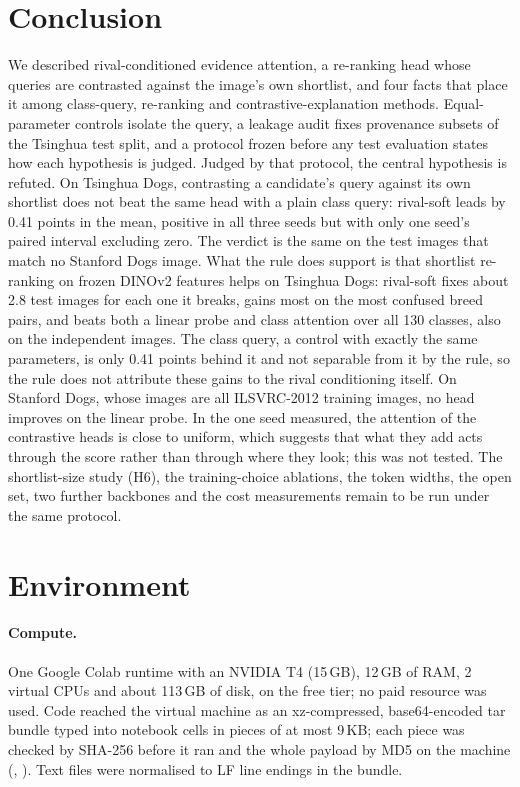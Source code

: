 \documentclass[11pt,a4paper]{article}
\theoremstyle{plain}
\newcommand{\fn}[1]{\texttt{\detokenize{#1}}}
\begin{document}
\section{Conclusion}\label{sec:conclusion}
We described rival-conditioned evidence attention, a re-ranking head whose queries are contrasted against the
image's own shortlist, and four facts that place it among class-query, re-ranking and contrastive-explanation methods.
Equal-parameter controls isolate the query, a leakage audit fixes provenance subsets of the Tsinghua test split, and
a protocol frozen before any test evaluation states how each hypothesis is judged.
Judged by that protocol, the central hypothesis is refuted. On Tsinghua Dogs, contrasting a candidate's query
against its own shortlist does not beat the same head with a plain class query: rival-soft leads by 0.41 points in
the mean, positive in all three seeds but with only one seed's paired interval excluding zero. The verdict is the same
on the test images that match no Stanford Dogs image. What the rule does support is that shortlist re-ranking on frozen
DINOv2 features helps on Tsinghua Dogs: rival-soft fixes about 2.8 test images for each one it breaks, gains most on
the most confused breed pairs, and beats both a linear probe and class attention over all 130 classes, also on the
independent images. The class query, a control with exactly the same parameters, is only 0.41 points behind it and
not separable from it by the rule, so the rule does not attribute these gains to the rival conditioning itself. On
Stanford Dogs, whose images are all ILSVRC-2012 training images, no head improves on the linear probe. In the one seed
measured, the attention of the contrastive heads is close to uniform, which suggests that what they add acts through
the score rather than through where they look; this was not tested. The shortlist-size study (H6), the
training-choice ablations, the token widths, the open set, two further backbones and the cost measurements remain to be
run under the same protocol.

\appendix

\section{Environment}\label{app:env}
\paragraph{Compute.} One Google Colab runtime with an NVIDIA T4 (15\,GB), 12\,GB of RAM, 2 virtual CPUs and about
113\,GB of disk, on the free tier; no paid resource was used. Code reached the virtual machine as an
xz-compressed, base64-encoded tar bundle typed into notebook cells in pieces of at most 9\,KB; each piece was checked
by SHA-256 before it ran and the whole payload by MD5 on the machine (\fn{dist/make_bundle.py},
\fn{dist/split_cell.py}). Text files were normalised to LF line endings in the bundle.
\end{document}
